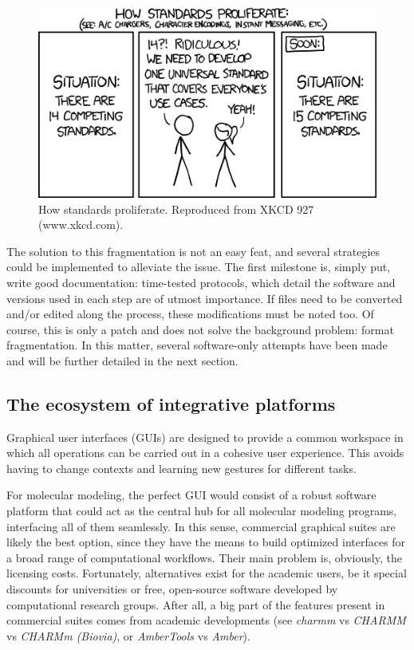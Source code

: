 \begin{figure}[H]
	\includegraphics[width=\textwidth]{./figures/01/xkcd927.png}
	\caption[Proliferation of standards]{How standards proliferate. Reproduced from XKCD 927 (www.xkcd.com).}
	\label{fig:xkcd}
\end{figure}



The solution to this fragmentation is not an easy feat, and several strategies could be implemented to alleviate the issue. The first milestone is, simply put, write good documentation: time-tested protocols, which detail the software and versions used in each step are of utmost importance. If files need to be converted and/or edited along the process, these modifications must be noted too. Of course, this is only a patch and does not solve the background problem: format fragmentation. In this matter, several software-only attempts have been made and will be further detailed in the next section.

\subsection{The ecosystem of integrative platforms}

Graphical user interfaces (GUIs) are designed to provide a common workspace in which all  operations can be carried out in a cohesive user experience. This avoids having to change contexts and learning new gestures for different tasks.

For molecular modeling, the perfect GUI would consist of a robust software platform that could act as the central hub for all molecular modeling programs, interfacing all of them seamlessly. In this sense, commercial graphical suites are likely the best option, since they have the means to build optimized interfaces for a broad range of computational workflows. Their main problem is, obviously, the licensing costs. Fortunately, alternatives exist for the academic users, be it special discounts for universities or free, open-source software developed by computational research groups. After all, a big part of the features present in commercial suites comes from academic developments (see \textit{charmm} vs \textit{CHARMM} vs \textit{CHARMm (Biovia)}, or \textit{AmberTools} vs \textit{Amber}).

